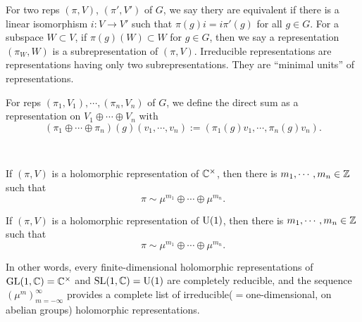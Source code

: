 \documentclass{../../small}
\begin{document}
\begin{defn}
For two reps $(\pi,V)$, $(\pi',V')$ of $G$, we say thery are equivalent if there is a linear isomorphism $i:V\to V'$ such that $\pi(g)i=i\pi'(g)$ for all $g\in G$.
For a subspace $W\subset V$, if $\pi(g)(W)\subset W$ for $g\in G$, then we say a representation $(\pi_W,W)$ is a subrepresentation of $(\pi,V)$.
Irreducible representations are representations having only two subrepresentations.
They are ``minimal units'' of representations.

For reps $(\pi_1,V_1),\cdots,(\pi_n,V_n)$ of $G$, we define the direct sum as a representation on $V_1\oplus\cdots\oplus V_n$ with
\[(\pi_1\oplus\cdots\oplus\pi_n)(g)(v_1,\cdots,v_n):=(\pi_1(g)v_1,\cdots,\pi_n(g)v_n).\]
\end{defn}
\begin{prop}\,
\begin{parts}
\item If $(\pi,V)$ is a holomorphic representation of $\mathbb{C}^\times$, then there is $m_1,\cdots,m_n\in\mathbb{Z}$ such that
\[\pi\sim\mu^{m_1}\oplus\cdots\oplus\mu^{m_n}.\]
\item If $(\pi,V)$ is a holomorphic representation of $\mathrm{U}(1)$, then there is $m_1,\cdots,m_n\in\mathbb{Z}$ such that
\[\pi\sim\mu^{m_1}\oplus\cdots\oplus\mu^{m_n}.\]
\end{parts}
In other words, every finite-dimensional holomorphic representations of $\mathrm{GL}(1,\mathbb{C})=\mathbb{C}^\times$ and $\mathrm{SL}(1,\mathbb{C})=\mathrm{U}(1)$ are completely reducible, and the sequence $(\mu^m)_{m=-\infty}^\infty$ provides a complete list of irreducible($=$one-dimensional, on abelian groups) holomorphic representations.
\end{prop} 
\end{document}
